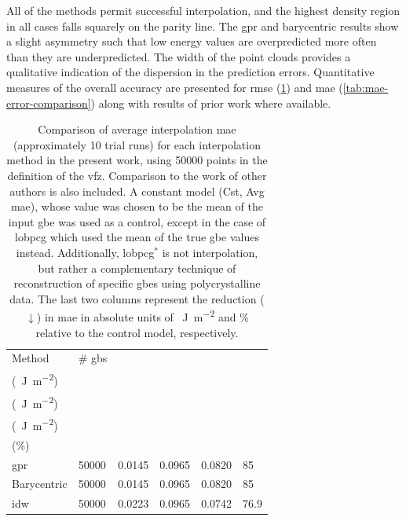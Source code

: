 \documentclass[final,twocolumn,12pt]{elsarticle}
\newcommand{\inpt}{input}
\begin{document}
All of the methods permit successful interpolation, and the highest density region in all cases falls squarely on the parity line. The \gls{gpr} and barycentric results show a slight asymmetry such that low energy values are overpredicted more often than they are underpredicted. The width of the point clouds provides a qualitative indication of the dispersion in the prediction errors. Quantitative measures of the overall accuracy are presented for \gls{rmse} (\cref{tab:rmse-error-comparison}) and \gls{mae} (\cref{tab:mae-error-comparison}) along with results of prior work where available.

\begin{table}[]
\centering
\caption{Comparison of average interpolation \gls{mae} (approximately 10 trial runs) for each interpolation method in the present work, using \num{50000} points in the definition of the \gls{vfz}. Comparison to the work of other authors is also included. A constant model (Cst, Avg \gls{mae}), whose value was chosen to be the mean of the \inpt{} \gls{gbe} was used as a control, except in the case of \gls{lobpcg} which used the mean of the true \gls{gbe} values instead. Additionally, \gls{lobpcg}$^*$ is not interpolation, but rather a complementary technique of reconstruction of specific \glspl{gbe} using polycrystalline data. The last two columns represent the reduction ($\downarrow$) in \gls{mae} in absolute units of \SI{}{\J\per\square\meter} and \% relative to the control model, respectively.}
\label{tab:rmse-error-comparison}
\begin{tabular}{@{}llllll@{}}
\toprule
Method &
  \# \glspl{gb} &
  \thead{\gls{mae} \\   (\SI{}{\J\per\square\meter})} &
  \thead{Cst, Avg \gls{mae} \\   (\SI{}{\J\per\square\meter})} &
  \thead{\gls{mae} $\downarrow$ \\   (\SI{}{\J\per\square\meter})} &
  \thead{\gls{mae}   $\downarrow$ \\ (\%)} \\ \midrule
\Gls{gpr}                                                     & \num{50000}  & \num{0.0145} & \num{0.0965} & \num{0.0820}  & \num{85}   \\
Barycentric                                                   & \num{50000}  & \num{0.0145} & \num{0.0965} & \num{0.0820}  & \num{85}   \\
\gls{idw}                                                     & \num{50000}  & \num{0.0223} & \num{0.0965} & \num{0.0742} & \num{76.9} \\

\end{tabular}
\end{table}
\end{document}
